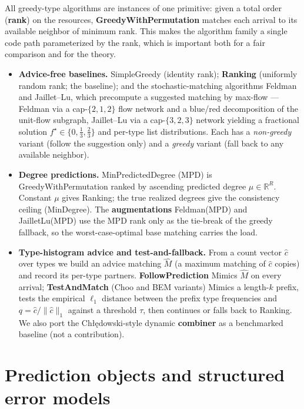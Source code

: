 All greedy-type algorithms are instances of one primitive: given a total order (\textbf{rank})
on the resources, \textbf{GreedyWithPermutation} matches each arrival to its available neighbor
of minimum rank. This makes the algorithm family a single code path parameterized by the
rank, which is important both for a fair comparison and for the theory.

\begin{itemize}
\item
  \textbf{Advice-free baselines.} SimpleGreedy (identity rank); \textbf{Ranking} (uniformly random
  rank; the baseline); and the stochastic-matching algorithms Feldman and Jaillet--Lu, which
  precompute a suggested matching by max-flow --- Feldman via a cap-\(\{2,1,2\}\) flow network
  and a blue/red decomposition of the unit-flow subgraph, Jaillet--Lu via a cap-\(\{3,2,3\}\)
  network yielding a fractional solution \(f^\star\in\{0,\tfrac13,\tfrac23\}\) and per-type
  list distributions. Each has a \emph{non-greedy} variant (follow the suggestion only) and a
  \emph{greedy} variant (fall back to any available neighbor).
\item
  \textbf{Degree predictions.} MinPredictedDegree (MPD) is GreedyWithPermutation ranked by
  ascending predicted degree \(\mu\in\mathbb R^R\). Constant \(\mu\) gives Ranking; the true
  realized degrees give the consistency ceiling (MinDegree). The \textbf{augmentations}
  Feldman(MPD) and JailletLu(MPD) use the MPD rank only as the tie-break of the greedy
  fallback, so the worst-case-optimal base matching carries the load.
\item
  \textbf{Type-histogram advice and test-and-fallback.} From a count vector \(\hat c\) over types
  we build an advice matching \(\hat M\) (a maximum matching of \(\hat c\) copies) and record its
  per-type partners. \textbf{FollowPrediction} Mimics \(\hat M\) on every arrival; \textbf{TestAndMatch}
  (Choo and BEM variants) Mimics a length-\(k\) prefix, tests the empirical \(\ell_1\) distance
  between the prefix type frequencies and \(q=\hat c/\lVert\hat c\rVert_1\) against a threshold
  \(\tau\), then continues or falls back to Ranking. We also port the Chłędowski-style dynamic
  \textbf{combiner} as a benchmarked baseline (not a contribution).
\end{itemize}

\section{Prediction objects and structured error models}\label{prediction-objects-and-structured-error-models}

